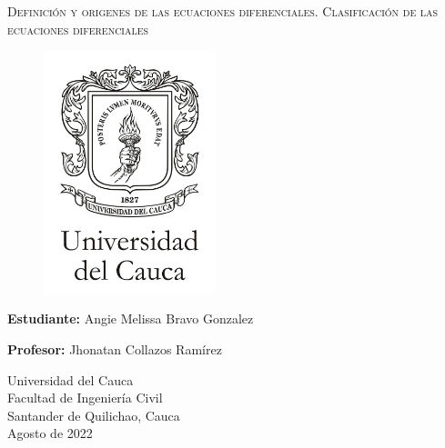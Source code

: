 \documentclass[12pt,a4paper,oneside]{book}
\begin{document}
	\lstset{language=Matlab, breaklines=true,tabsize=2,stepnumber=1,numbersep=5pt,numbers=left,numberstyle=\footnotesize }
	
	\thispagestyle{empty}
	\begin{titlepage}
		\date{}
		\begin{center}
			\vspace{5ex}
			{\Large \textsc{ Definición y origenes de las ecuaciones diferenciales. Clasificación de las ecuaciones diferenciales}}
			
		\end{center}\vspace{3cm}
		\begin{figure}[h]
			\centering
			\includegraphics[width=5cm]{Figura_Logo_de_Unicauca.jpg}
		\end{figure}
		\begin{center}
			\vspace{2.5cm}
			\textbf{Estudiante:} Angie Melissa Bravo Gonzalez
		\end{center}
	    \begin{center}
	    	\vspace{0.5cm}
	    	\textbf{Profesor:} Jhonatan Collazos Ramírez
	    \end{center}
		
		\vspace{3cm}
		\begin{center}
			{\Large\sc
				Universidad del Cauca\\
				Facultad de Ingeniería Civil\\
				Santander de Quilichao, Cauca\\[1.5ex]
				Agosto de 2022}
		\end{center}
	\end{titlepage}
\end{document}
